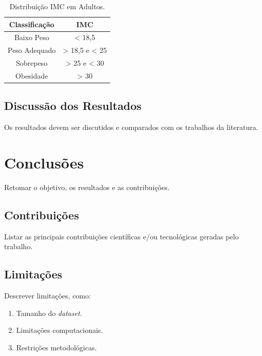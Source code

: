 \documentclass[
	12pt,				    %
	openright,			    %
	oneside,			    %
	a4paper,			    %
    sumario=tradicional,    %
	english,			    %
	brazil,				    %
	]{abntex2}
\begin{document}
\begin{table}[!htb]
\begin{center}
\caption{Distribuição IMC em Adultos.}
\label{tab:exetab}
\begin{tabular}{c|c}
\hline
\textbf{\textbf{Classificação}} & \textbf{IMC}\\
\hline
Baixo Peso & < 18,5 \\
Peso Adequado & > 18,5 e < 25 \\
Sobrepeso & > 25 e < 30 \\
Obesidade & > 30 \\
\hline
\end{tabular}
\end{center}
\end{table}

\section{Discussão dos Resultados}

Os resultados devem ser discutidos e comparados com os trabalhos da literatura.

\chapter{Conclusões}

Retomar o objetivo, os resultados e as contribuições.

\section{Contribuições}

Listar as principais contribuições científicas e/ou tecnológicas geradas pelo trabalho.

\section{Limitações}

Descrever limitações, como:
\begin{enumerate}
    \item Tamanho do \textit{dataset}.
    \item Limitações computacionais.
    \item Restrições metodológicas.
\end{enumerate}
\end{document}

